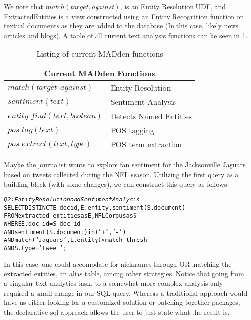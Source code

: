 We note that $match(target, against)$, is an Entity
Resolution UDF, and ExtractedEntities is a view constructed 
using an Entity Recognition function on textual documents as they
are added to the database (In this case, likely news articles and blogs). A
table of all current text analysis functions can be seen in
\ref{tab:madfunct}. \\

\begin{table}
\begin{center}
\begin{tabular}{|l|l|}
\hline
\multicolumn{2}{|c|}{Current MADden Functions}\\
\hline
$match(target, against)$ & Entity Resolution\\
\hline
$sentiment(text)$ & Sentiment Analysis\\
\hline
$entity\_find(text, boolean)$ & Detects Named Entities\\
\hline
$pos\_tag(text)$ & POS tagging\\
\hline
$pos\_extract(text, type)$ & POS term extraction \\
\hline
\end{tabular}
\end{center}
\caption{Listing of current MADden functions}
\label{tab:madfunct}
\end{table}

Maybe the journalist wants to explore fan sentiment for the Jacksonville Jaguars
based on tweets collected during the NFL season. Utilizing the first 
query as a building block (with some changes), we can construct this 
query as follows:

\begin{small}
\begin{alltt}
\textit{Q2: Entity Resolution and Sentiment Analysis}
SELECT DISTINCT E.docid, E.entity, sentiment(S.document)
FROM extracted_entities as E, NFLCorpus as S
WHERE E.doc_id = S.doc_id
  AND sentiment(S.document) in ('+', '-')
  AND match('Jaguars', E.entity) > match\_thresh
  AND S.type = 'tweet';
\end{alltt}
\end{small}

In this case, one could accomodate for nicknames through OR-matching
the extracted entities, an alias table, among other strategies. Notice
that going from a singular text analytics task, to a somewhat more 
complex analysis only required a small change in our SQL query. 
Whereas a traditional approach would have us either looking for a
customized solution or patching together packages, the declarative
sql approach allows the user to just state what the result is.

